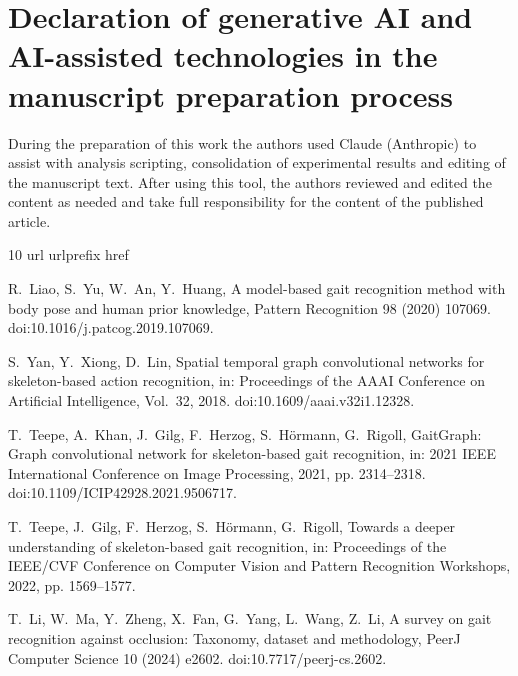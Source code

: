 \documentclass[review,12pt]{elsarticle}
\begin{document}
\section*{Declaration of generative AI and AI-assisted technologies in the manuscript preparation process}
During the preparation of this work the authors used Claude (Anthropic) to
assist with analysis scripting, consolidation of experimental results and
editing of the manuscript text. After using this tool, the authors reviewed and
edited the content as needed and take full responsibility for the content of
the published article.

\begin{thebibliography}{10}
\expandafter\ifx\csname url\endcsname\relax
  \def\url#1{\texttt{#1}}\fi
\expandafter\ifx\csname urlprefix\endcsname\relax\def\urlprefix{URL }\fi
\expandafter\ifx\csname href\endcsname\relax
  \def\href#1#2{#2} \def\path#1{#1}\fi

R.~Liao, S.~Yu, W.~An, Y.~Huang, A model-based gait recognition method with
  body pose and human prior knowledge, {Pattern Recognition} 98 (2020) 107069.
\newblock \href {https://doi.org/10.1016/j.patcog.2019.107069}
  {\path{doi:10.1016/j.patcog.2019.107069}}.

S.~Yan, Y.~Xiong, D.~Lin, Spatial temporal graph convolutional networks for
  skeleton-based action recognition, in: {Proceedings of the AAAI Conference on
  Artificial Intelligence}, Vol.~32, 2018.
\newblock \href {https://doi.org/10.1609/aaai.v32i1.12328}
  {\path{doi:10.1609/aaai.v32i1.12328}}.

T.~Teepe, A.~Khan, J.~Gilg, F.~Herzog, S.~H{\"o}rmann, G.~Rigoll, {GaitGraph}:
  Graph convolutional network for skeleton-based gait recognition, in: {2021
  IEEE International Conference on Image Processing}, 2021, pp. 2314--2318.
\newblock \href {https://doi.org/10.1109/ICIP42928.2021.9506717}
  {\path{doi:10.1109/ICIP42928.2021.9506717}}.

T.~Teepe, J.~Gilg, F.~Herzog, S.~H{\"o}rmann, G.~Rigoll, Towards a deeper
  understanding of skeleton-based gait recognition, in: {Proceedings of the
  IEEE/CVF Conference on Computer Vision and Pattern Recognition Workshops},
  2022, pp. 1569--1577.

T.~Li, W.~Ma, Y.~Zheng, X.~Fan, G.~Yang, L.~Wang, Z.~Li, A survey on gait
  recognition against occlusion: Taxonomy, dataset and methodology, {PeerJ
  Computer Science} 10 (2024) e2602.
\newblock \href {https://doi.org/10.7717/peerj-cs.2602}
  {\path{doi:10.7717/peerj-cs.2602}}.


\end{thebibliography}
\end{document}
